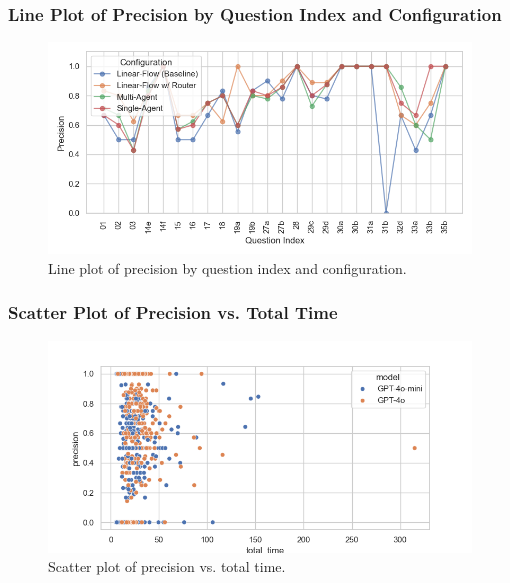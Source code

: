             \subsubsection{Line Plot of Precision by Question Index and Configuration}
            \begin{figure}[H]
                \centering
                \includegraphics[width=\textwidth]{images_exp2/precision/precision_lineplot_by_question_index_and_configuration.png}
                \caption{Line plot of precision by question index and configuration.}
                \label{fig:precision_lineplot_by_question_index_and_configuration}
            \end{figure}

            \subsubsection{Scatter Plot of Precision vs. Total Time}
            \begin{figure}[H]
                \centering
                \includegraphics[scale=0.75]{images_exp2/precision/scatter_precision_vs_total_time.png}
                \caption{Scatter plot of precision vs. total time.}
                \label{fig:scatter_precision_vs_total_time}
            \end{figure}

